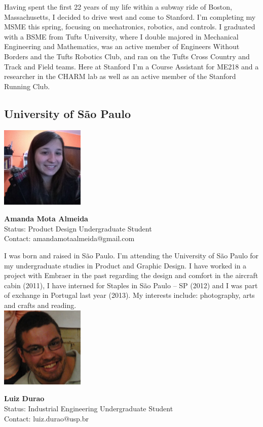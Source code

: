 Having spent the first 22 years of my life within a subway ride of Boston, Massachusetts, I decided to drive west and come to Stanford. I'm completing my MSME this spring, focusing on mechatronics, robotics, and controls. I graduated with a BSME from Tufts University, where I double majored in Mechanical Engineering and Mathematics, was an active member of Engineers Without Borders and the Tufts Robotics Club, and ran on the Tufts Cross Country and Track and Field teams. Here at Stanford I'm a Course Assistant for ME218 and a researcher in the CHARM lab as well as an active member of the Stanford Running Club.

\subsection*{University of S\~{a}o Paulo}

\noindent \includegraphics[width=40mm]{images/image013}
\parbox[b]{0.6\textwidth}{\textbf{Amanda Mota Almeida}\\
Status: Product Design Undergraduate Student\\
Contact: amandamotaalmeida@gmail.com \\
}

I was born and raised in S\~{a}o Paulo. I'm attending the University of S\~{a}o Paulo for my undergraduate studies in Product and Graphic Design. I have worked in a project with Embraer in the past regarding the design and comfort in the aircraft cabin (2011), I have interned for Staples in S\~{a}o Paulo – SP (2012) and I was part of exchange in Portugal last year (2013). My interests include: photography, arts and crafts and reading.
\\ 



\noindent \includegraphics[width=40mm]{images/image015}
\parbox[b]{0.6\textwidth}{\textbf{Luiz Durao}\\
Status: Industrial Engineering Undergraduate Student \\
Contact: luiz.durao@usp.br  \\
}

